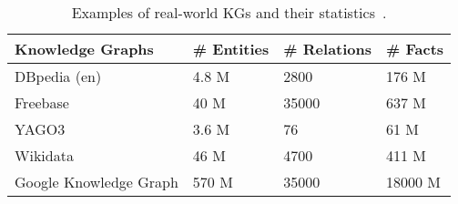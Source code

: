 \begin{table}[t]
\centering


\begin{tabular}{@{}llll@{}}
\toprule
Knowledge Graphs       & \# Entities & \# Relations & \# Facts \\ \midrule
DBpedia (en)%
					   &      4.8 M  &       2800       &   176 M       \\
Freebase			   &     40 M    &      35000   &    637 M \\
YAGO3%
 &      3.6 M   &       76   &   61 M  \\
Wikidata%
&      46 M   &       4700   &   411 M  \\
Google Knowledge Graph &      570 M  &       35000  &   18000 M\\ \bottomrule
\end{tabular}
\caption{Examples of real-world KGs and their statistics~\cite{Nickel2015ARO,DBLP:journals/semweb/Paulheim17}.}
\label{tab:kgs}

\end{table}